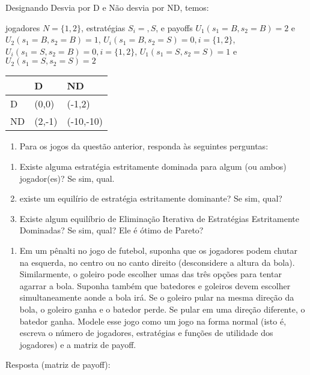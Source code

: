 \documentclass[
]{article}
\providecommand{\tightlist}{%
  \setlength{\itemsep}{0pt}\setlength{\parskip}{0pt}}
\begin{document}
Designando Desvia por D e Não desvia por ND, temos:

jogadores \(N = \{1,2\}\), estratégias \(S_i = {, S}\), e payoffs
\(U_1(s_1=B, s_2=B) = 2\) e \(U_2(s_1=B, s_2=B) = 1\),
\(U_i(s_1=B, s_2=S) = 0, i = \{1,2\}\),
\(U_i(s_1=S, s_2=B) = 0, i = \{1,2\}\), \(U_1(s_1=S, s_2=S) = 1\) e
\(U_2(s_1=S, s_2=S) = 2\)

\begin{longtable}[]{@{}lll@{}}
\toprule
& D & ND\tabularnewline
\midrule
\endhead
D & (0,0) & (-1,2)\tabularnewline
ND & (2,-1) & (-10,-10)\tabularnewline
\bottomrule
\end{longtable}

\begin{enumerate}
\def\labelenumi{\arabic{enumi}.}
\setcounter{enumi}{1}
\tightlist
\item
  Para os jogos da questão anterior, responda às seguintes perguntas:
\end{enumerate}

\begin{enumerate}
\def\labelenumi{\alph{enumi})}
\tightlist
\item
  Existe alguma estratégia estritamente dominada para algum (ou ambos)
  jogador(es)? Se sim, qual.
\item
  existe um equilírio de estratégia estritamente dominante? Se sim,
  qual?
\item
  Existe algum equilíbrio de Eliminação Iterativa de Estratégias
  Estritamente Dominadas? Se sim, qual? Ele é ótimo de Pareto?
\end{enumerate}

\begin{enumerate}
\def\labelenumi{\arabic{enumi}.}
\setcounter{enumi}{5}
\tightlist
\item
  Em um pênalti no jogo de futebol, suponha que os jogadores podem
  chutar na esquerda, no centro ou no canto direito (desconsidere a
  altura da bola). Similarmente, o goleiro pode escolher umas das três
  opções para tentar agarrar a bola. Suponha também que batedores e
  goleiros devem escolher simultaneamente aonde a bola irá. Se o goleiro
  pular na mesma direção da bola, o goleiro ganha e o batedor perde. Se
  pular em uma direção diferente, o batedor ganha. Modele esse jogo como
  um jogo na forma normal (isto é, escreva o número de jogadores,
  estratégias e funções de utilidade dos jogadores) e a matriz de
  payoff.
\end{enumerate}

Resposta (matriz de payoff):
\end{document}
